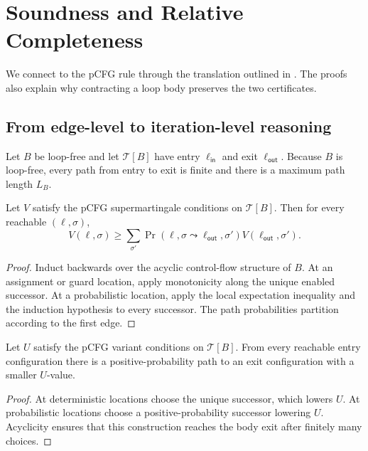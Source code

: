 \section{Soundness and Relative Completeness}
\label{sec:metatheory}

We connect  to the pCFG rule through the translation outlined in . The proofs also explain why contracting a loop body preserves the two certificates.

\subsection{From edge-level to iteration-level reasoning}

Let $B$ be loop-free and let $\mathcal{T}[B]$ have entry $\ell_{\mathsf{in}}$ and exit $\ell_{\mathsf{out}}$. Because $B$ is loop-free, every path from entry to exit is finite and there is a maximum path length $L_B$.

\begin{lemma}
\label{lem:contract-v}
Let $V$ satisfy the pCFG supermartingale conditions on $\mathcal{T}[B]$. Then for every reachable $(\ell,\sigma)$,
\[
 V(\ell,\sigma)\geq
 \sum_{\sigma'}\Pr(\ell,\sigma\leadsto\ell_{\mathsf{out}},\sigma')
 V(\ell_{\mathsf{out}},\sigma').
\]
\end{lemma}
\begin{proof}
Induct backwards over the acyclic control-flow structure of $B$. At an assignment or guard location, apply monotonicity along the unique enabled successor. At a probabilistic location, apply the local expectation inequality and the induction hypothesis to every successor. The path probabilities partition according to the first edge.
\end{proof}

\begin{lemma}
\label{lem:contract-u}
Let $U$ satisfy the pCFG variant conditions on $\mathcal{T}[B]$. From every reachable entry configuration there is a positive-probability path to an exit configuration with a smaller $U$-value.
\end{lemma}
\begin{proof}
At deterministic locations choose the unique successor, which lowers $U$. At probabilistic locations choose a positive-probability successor lowering $U$. Acyclicity ensures that this construction reaches the body exit after finitely many choices.
\end{proof}

